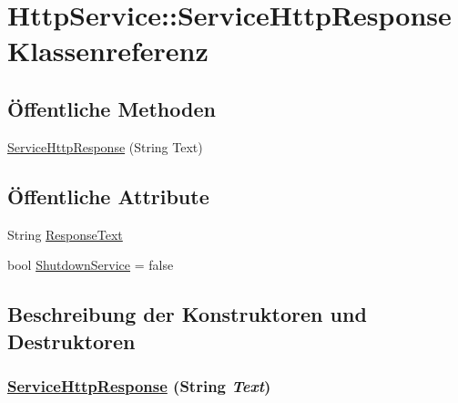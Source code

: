\hypertarget{classQbeSAS_1_1HttpService_1_1ServiceHttpResponse}{
\section{Http\-Service::Service\-Http\-Response Klassenreferenz}
\label{classQbeSAS_1_1HttpService_1_1ServiceHttpResponse}
}
\subsection*{\"{O}ffentliche Methoden}
\begin{CompactItemize}
\item 
\hyperlink{classQbeSAS_1_1HttpService_1_1ServiceHttpResponse_QbeSAS_1_1HttpService_1_1ServiceHttpResponsea0}{Service\-Http\-Response} (String Text)
\end{CompactItemize}
\subsection*{\"{O}ffentliche Attribute}
\begin{CompactItemize}
\item 
String \hyperlink{classQbeSAS_1_1HttpService_1_1ServiceHttpResponse_QbeSAS_1_1HttpService_1_1ServiceHttpResponseo0}{Response\-Text}
\item 
bool \hyperlink{classQbeSAS_1_1HttpService_1_1ServiceHttpResponse_QbeSAS_1_1HttpService_1_1ServiceHttpResponseo1}{Shutdown\-Service} = false
\end{CompactItemize}


\subsection{Beschreibung der Konstruktoren und Destruktoren}
\hypertarget{classQbeSAS_1_1HttpService_1_1ServiceHttpResponse_QbeSAS_1_1HttpService_1_1ServiceHttpResponsea0}{
\subsubsection[ServiceHttpResponse]{\setlength{\rightskip}{0pt plus 5cm}\hyperlink{classQbeSAS_1_1HttpService_1_1ServiceHttpResponse}{Service\-Http\-Response} (String {\em Text})}}
\label{classQbeSAS_1_1HttpService_1_1ServiceHttpResponse_QbeSAS_1_1HttpService_1_1ServiceHttpResponsea0}




